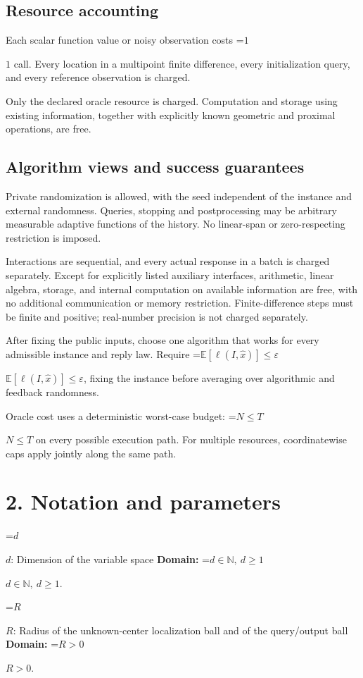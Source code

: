 \documentclass[10pt,a4paper]{article}
\newcommand{\AtlasMath}[1]{\par\begingroup\centering\setbox0=\hbox{$\displaystyle #1$}\ifdim\wd0>1.4\linewidth\typeout{ATLAS WIDE FORMULA: \the\wd0}\fi\ifdim\wd0>\linewidth\resizebox{\linewidth}{!}{\box0}\else\box0\fi\par\endgroup}
\newcommand{\AtlasInlineMath}[1]{\begingroup\setbox0=\hbox{$#1$}\ifdim\wd0>.4\linewidth\endgroup\AtlasMath{#1}\else\endgroup$#1$\fi}
\begin{document}
\subsection{Resource accounting}
Each scalar function value or noisy observation costs \AtlasInlineMath{1} call. Every location in a multipoint finite difference, every initialization query, and every reference observation is charged.

Only the declared oracle resource is charged. Computation and storage using existing information, together with explicitly known geometric and proximal operations, are free.

\subsection{Algorithm views and success guarantees}
Private randomization is allowed, with the seed independent of the instance and external randomness. Queries, stopping and postprocessing may be arbitrary measurable adaptive functions of the history. No linear-span or zero-respecting restriction is imposed.

Interactions are sequential, and every actual response in a batch is charged separately. Except for explicitly listed auxiliary interfaces, arithmetic, linear algebra, storage, and internal computation on available information are free, with no additional communication or memory restriction. Finite-difference steps must be finite and positive; real-number precision is not charged separately.

After fixing the public inputs, choose one algorithm that works for every admissible instance and reply law. Require \AtlasInlineMath{\mathbb{E}[\ell(I,\widehat{x})]\le \varepsilon}, fixing the instance before averaging over algorithmic and feedback randomness.

Oracle cost uses a deterministic worst-case budget: \AtlasInlineMath{N\le T} on every possible execution path. For multiple resources, coordinatewise caps apply jointly along the same path.

\section{2. Notation and parameters}
\AtlasInlineMath{d}: Dimension of the variable space \textbf{Domain:} \AtlasInlineMath{d\in\mathbb{N},\ d\ge1}.

\AtlasInlineMath{R}: Radius of the unknown-center localization ball and of the query/output ball \textbf{Domain:} \AtlasInlineMath{R>0}.
\end{document}
